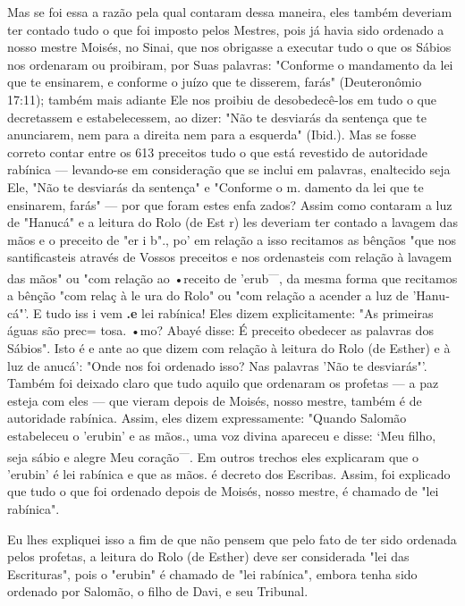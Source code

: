 \begin{itemize}
\begin{enumrate}
Mas se foi essa a razão pela qual contaram dessa maneira, eles tam­bém
deveriam ter contado tudo o que foi imposto pelos Mestres, pois já havia
sido ordenado a nosso mestre Moisés, no Sinai, que nos obrigasse a
executar tudo o que os Sábios nos ordenaram ou proibiram, por Suas
palavras: "Confor­me o mandamento da lei que te ensinarem, e conforme o
juízo que te disse­rem, farás" (Deuteronômio 17:11); também mais adiante
Ele nos proibiu de desobedecê-los em tudo o que decretassem e
estabelecessem, ao dizer: "Não te desviarás da sentença que te
anunciarem, nem para a direita nem para a es­querda" (Ibid.). Mas se
fosse correto contar entre os 613 preceitos tudo o que está revestido de
autoridade rabínica --- levando-se em consideração que se in­clui em
palavras, enaltecido seja Ele, "Não te desviarás da sentença" e
"Con­forme o m. damento da lei que te ensinarem, farás" --- por que
foram estes enfa zados? Assim como contaram a luz de "Hanucá" e a
leitura do Rolo (de Est r) les deveriam ter contado a lavagem das mãos e
o preceito de "er i b"., po' em relação a isso
recitamos as bênçãos "que nos santificasteis
através de Vossos preceitos e nos ordenasteis com relação à lavagem das
mãos" ou "com relação ao •receito de 'erub\textsuperscript{---}, da
mesma forma que recitamos a bên­ção "com relaç à le ura do Rolo" ou "com
relação a acender a luz de 'Hanu­cá"'. E tudo iss i vem
\textbf{.e} lei rabínica! Eles dizem explicitamente:
"As primeiras águas são prec= tosa. •mo? Abayé disse: É preceito
obedecer as palavras dos Sábios". Isto é e ante ao que dizem com relação
à leitura do Rolo (de Es­ther) e à luz de anucá': "Onde nos foi ordenado
isso? Nas palavras 'Não te desviarás"'. Também foi deixado claro que
tudo aquilo que ordenaram os pro­fetas --- a paz esteja com eles --- que
vieram depois de Moisés, nosso mestre, também é de autoridade rabínica.
Assim, eles dizem expressamente: "Quando Salomão estabeleceu o 'erubin'
e as mãos., uma voz divina apareceu e disse: `Meu
filho, seja sábio e alegre Meu coração\textsuperscript{---}. Em outros
trechos eles explica­ram que o 'erubin' é lei rabínica e que as
mãos. é decreto dos Escribas. Assim, foi explicado que
tudo o que foi ordenado depois de Moisés, nosso mestre, é chamado de
"lei rabínica".

Eu lhes expliquei isso a fim de que não pensem que pelo fato de ter sido
ordenada pelos profetas, a leitura do Rolo (de Esther) deve ser
considera­da "lei das Escrituras", pois o "erubin" é chamado de "lei
rabínica", embora tenha sido ordenado por Salomão, o filho de Davi, e
seu Tribunal.


\end{enumrate}
\end{itemize}
